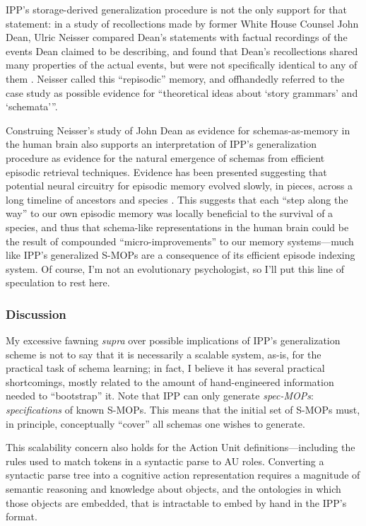 IPP's storage-derived generalization procedure is not the only support for that statement: in a study of recollections made by former White House Counsel John Dean, Ulric Neisser compared Dean's statements with factual recordings of the events Dean claimed to be describing, and found that Dean's recollections shared many properties of the actual events, but were not specifically identical to any of them \citep{repisodic}. Neisser called this ``repisodic'' memory, and offhandedly referred to the case study as possible evidence for ``theoretical ideas about `story grammars' and `schemata'{}''.

Construing Neisser's study of John Dean as evidence for schemas-as-memory in the human brain also supports an interpretation of IPP's generalization procedure as evidence for the natural emergence of schemas from efficient episodic retrieval techniques. Evidence has been presented suggesting that potential neural circuitry for episodic memory evolved slowly, in pieces, across a long timeline of ancestors and species \citep{allen2013evolution}. This suggests that each ``step along the way'' to our own episodic memory was locally beneficial to the survival of a species, and thus that schema-like representations in the human brain could be the result of compounded ``micro-improvements'' to our memory systems---much like IPP's generalized S-MOPs are a consequence of its efficient episode indexing system. Of course, I'm not an evolutionary psychologist, so I'll put this line of speculation to rest here.

\subsubsection{Discussion}
My excessive fawning \textit{supra} over possible implications of IPP's generalization scheme is not to say that it is necessarily a scalable system, as-is, for the practical task of schema learning; in fact, I believe it has several practical shortcomings, mostly related to the amount of hand-engineered information needed to ``bootstrap'' it. Note that IPP can only generate \textit{spec-MOPs}: \textit{specifications} of known S-MOPs. This means that the initial set of S-MOPs must, in principle, conceptually ``cover'' all schemas one wishes to generate.

This scalability concern also holds for the Action Unit definitions---including the rules used to match tokens in a syntactic parse to AU roles. Converting a syntactic parse tree into a cognitive action representation requires a magnitude of semantic reasoning and knowledge about objects, and the ontologies in which those objects are embedded, that is intractable to embed by hand in the IPP's format.

